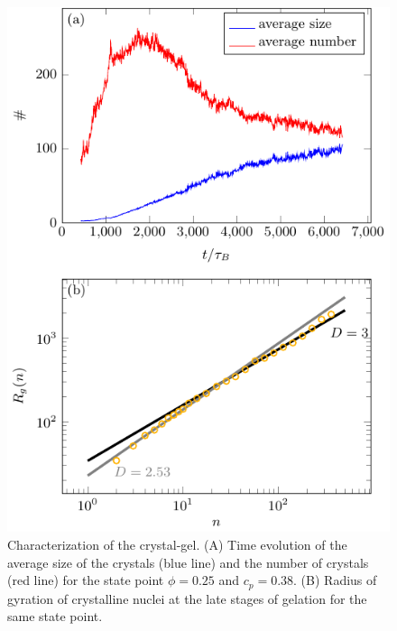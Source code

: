 \documentclass[12pt]{article}
\begin{document}
\begin{figure}[!t]
 \centering
 \includegraphics[width=12cm]{characterisation}
\caption{Characterization of the crystal-gel. (A) Time evolution of the average size of the crystals (blue line) and the number of crystals (red line) for the state point $\phi=0.25$ and $c_p=0.38$. (B) Radius of gyration of crystalline nuclei at the late stages of gelation for the same state point.} 
 \label{fig:crystals}
\end{figure}

\clearpage 
\end{document}

